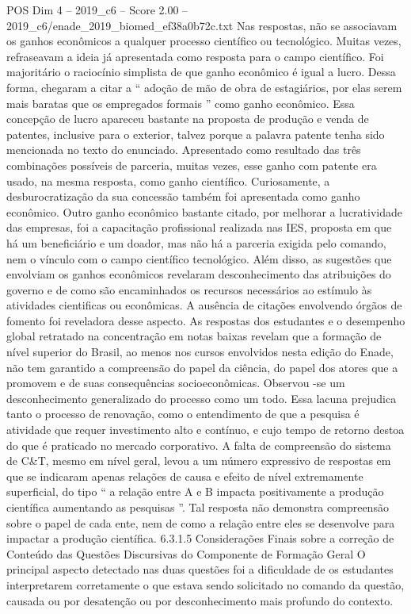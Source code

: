 \begin{textsample}{POS Dim 4 – 2019\_c6 – Score 2.00 – 2019\_c6/enade\_2019\_biomed\_ef38a0b72c.txt}
Nas respostas, não se associavam os ganhos econômicos a qualquer processo científico ou tecnológico.
Muitas vezes, refraseavam a ideia já apresentada como resposta para o campo científico.
Foi majoritário o raciocínio simplista de que ganho econômico é igual a lucro.
Dessa forma, chegaram a citar a “ adoção de mão de obra de estagiários, por elas serem mais baratas que os empregados formais ” como ganho econômico.
Essa concepção de lucro apareceu bastante na proposta de produção e venda de patentes, inclusive para o exterior, talvez porque a palavra patente tenha sido mencionada no texto do enunciado.
Apresentado como resultado das três combinações possíveis de parceria, muitas vezes, esse ganho com patente era usado, na mesma resposta, como ganho científico.
Curiosamente, a desburocratização da sua concessão também foi apresentada como ganho econômico.
Outro ganho econômico bastante citado, por melhorar a lucratividade das empresas, foi a capacitação profissional realizada nas IES, proposta em que há um beneficiário e um doador, mas não há a parceria exigida pelo comando, nem o vínculo com o campo científico tecnológico.
Além disso, as sugestões que envolviam os ganhos econômicos revelaram desconhecimento das atribuições do governo e de como são encaminhados os recursos necessários ao estímulo às atividades cientificas ou econômicas.
A ausência de citações envolvendo órgãos de fomento foi reveladora desse aspecto.
As respostas dos estudantes e o desempenho global retratado na concentração em notas baixas revelam que a formação de nível superior do Brasil, ao menos nos cursos envolvidos nesta edição do Enade, não tem garantido a compreensão do papel da ciência, do papel dos atores que a promovem e de suas consequências socioeconômicas.
Observou -se um desconhecimento generalizado do processo como um todo.
Essa lacuna prejudica tanto o processo de renovação, como o entendimento de que a pesquisa é atividade que requer investimento alto e contínuo, e cujo tempo de retorno destoa do que é praticado no mercado corporativo.
A falta de compreensão do sistema de C\&T, mesmo em nível geral, levou a um número expressivo de respostas em que se indicaram apenas relações de causa e efeito de nível extremamente superficial, do tipo “ a relação entre A e B impacta positivamente a produção científica aumentando as pesquisas ”.
Tal resposta não demonstra compreensão sobre o papel de cada ente, nem de como a relação entre eles se desenvolve para impactar a produção científica. 6.3.1.5 Considerações Finais sobre a correção de Conteúdo das Questões Discursivas do Componente de Formação Geral O principal aspecto detectado nas duas questões foi a dificuldade de os estudantes interpretarem corretamente o que estava sendo solicitado no comando da questão, causada ou por desatenção ou por desconhecimento mais profundo do contexto.

\end{textsample}
